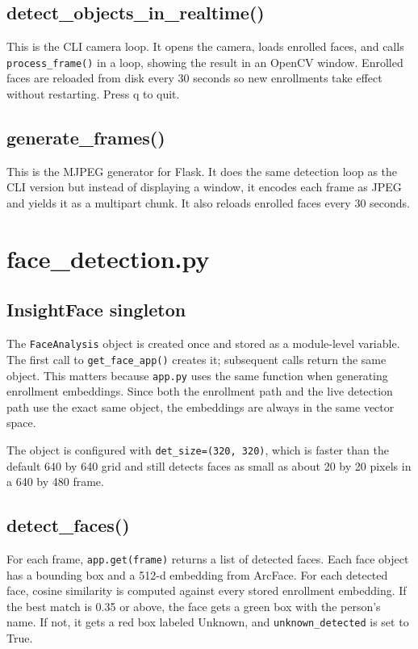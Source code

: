 \documentclass[12pt,a4paper]{report}
\begin{document}
\subsection{detect\_objects\_in\_realtime()}

This is the CLI camera loop. It opens the camera, loads enrolled faces, and calls \texttt{process\_frame()} in a loop, showing the result in an OpenCV window. Enrolled faces are reloaded from disk every 30 seconds so new enrollments take effect without restarting. Press q to quit.

\subsection{generate\_frames()}

This is the MJPEG generator for Flask. It does the same detection loop as the CLI version but instead of displaying a window, it encodes each frame as JPEG and yields it as a multipart chunk. It also reloads enrolled faces every 30 seconds.

\section{face\_detection.py}

\subsection{InsightFace singleton}

The \texttt{FaceAnalysis} object is created once and stored as a module-level variable. The first call to \texttt{get\_face\_app()} creates it; subsequent calls return the same object. This matters because \texttt{app.py} uses the same function when generating enrollment embeddings. Since both the enrollment path and the live detection path use the exact same object, the embeddings are always in the same vector space.

The object is configured with \texttt{det\_size=(320, 320)}, which is faster than the default 640 by 640 grid and still detects faces as small as about 20 by 20 pixels in a 640 by 480 frame.

\subsection{detect\_faces()}

For each frame, \texttt{app.get(frame)} returns a list of detected faces. Each face object has a bounding box and a 512-d embedding from ArcFace. For each detected face, cosine similarity is computed against every stored enrollment embedding. If the best match is 0.35 or above, the face gets a green box with the person's name. If not, it gets a red box labeled Unknown, and \texttt{unknown\_detected} is set to True.
\end{document}
